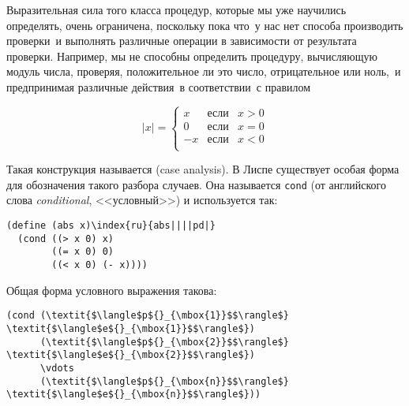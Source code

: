 {Выразительная сила того класса процедур, которые мы уже
научились определять, очень ограничена, поскольку пока что~у нас нет
способа производить проверки~и выполнять различные операции в
зависимости от результата проверки.  Например, мы не способны
определить процедуру, вычисляющую модуль числа, проверяя,
положительное ли это число, отрицательное или ноль,~и предпринимая
различные действия~в соответствии~с правилом

}
$$
     |x| = \left\{
        \begin{array}{rll}
          x & \mbox{если} & x > 0 \\
          0 & \mbox{если} & x = 0 \\
          - x & \mbox{если} & x < 0 \\
        \end{array}
        \right.
$$
{%
Такая конструкция называется  (case analysis). В
Лиспе су\-щес\-т\-ву\-ет особая форма для обозначения такого разбора
случаев.%
Она называется {\tt cond} (от английского
%
%
слова {\em conditional}, <<условный>>) и
используется так:

}
\begin{Verbatim}[fontsize=\small]
(define (abs x)\index{ru}{abs||||pd|}
  (cond ((> x 0) x)
        ((= x 0) 0)
        ((< x 0) (- x))))
\end{Verbatim}
%
%
%
Общая форма условного выражения такова:

\begin{Verbatim}[fontsize=\small]
(cond (\textit{$\langle$p${}_{\mbox{1}}$$\rangle$} \textit{$\langle$e${}_{\mbox{1}}$$\rangle$})
      (\textit{$\langle$p${}_{\mbox{2}}$$\rangle$} \textit{$\langle$e${}_{\mbox{2}}$$\rangle$})
      \vdots
      (\textit{$\langle$p${}_{\mbox{n}}$$\rangle$} \textit{$\langle$e${}_{\mbox{n}}$$\rangle$}))
\end{Verbatim}


